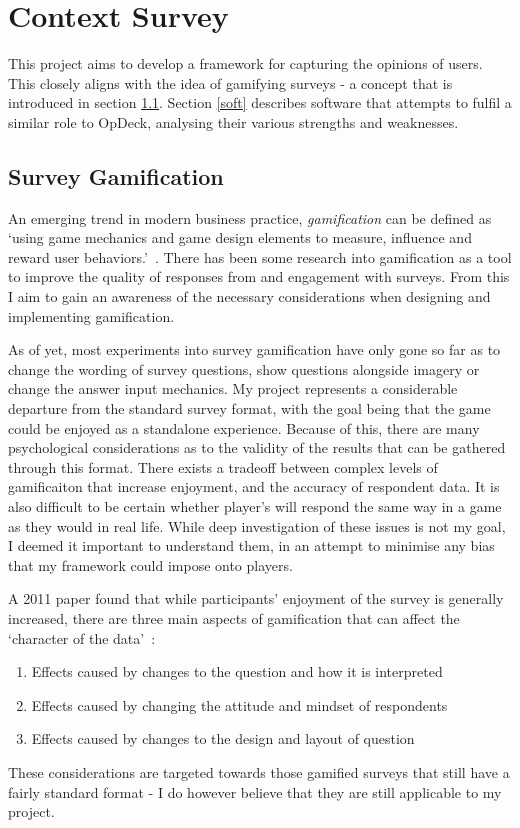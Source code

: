 \chapter{Context Survey}

This project aims to develop a framework for capturing the opinions of users. This closely aligns with the idea of gamifying surveys - a concept that is introduced in section \ref{surgam}. Section \ref{soft} describes software that attempts to fulfil a similar role to OpDeck, analysing their various strengths and weaknesses.

\section{Survey Gamification}\label{surgam}
An emerging trend in modern business practice, \textit{gamification} can be defined as `using game mechanics and game design elements to measure, influence and reward user behaviors.'~\cite{7804551}. 
There has been some research into gamification as a tool to improve the quality of responses from and engagement with surveys. From this I aim to gain an awareness of the necessary considerations when designing and implementing gamification.

As of yet, most experiments into survey gamification have only gone so far as to change the wording of survey questions, show questions alongside imagery or change the answer input mechanics.
My project represents a considerable departure from the standard survey format, with the goal being that the game could be enjoyed as a standalone experience. 
Because of this, there are many psychological considerations as to the validity of the results that can be gathered through this format. 
There exists a tradeoff between complex levels of gamificaiton that increase enjoyment, and the accuracy of respondent data. 
It is also difficult to be certain whether player's will respond the same way in a game as they would in real life.
While deep investigation of these issues is not my goal, I deemed it important to understand them, in an attempt to minimise any bias that my framework could impose onto players.

A 2011 paper found that while participants' enjoyment of the survey is generally increased, there are three main aspects of gamification that can affect the `character of the data'~\cite{GameExperiments}:
\begin{enumerate}[label=\textbf{e.\arabic*}]
    \item\label{cd:q} Effects caused by changes to the question and how it is interpreted
    \item\label{cd:m} Effects caused by changing the attitude and mindset of respondents
    \item\label{cd:l} Effects caused by changes to the design and layout of question
\end{enumerate}
These considerations are targeted towards those gamified surveys that still have a fairly standard format - I do however believe that they are still applicable to my project. 

